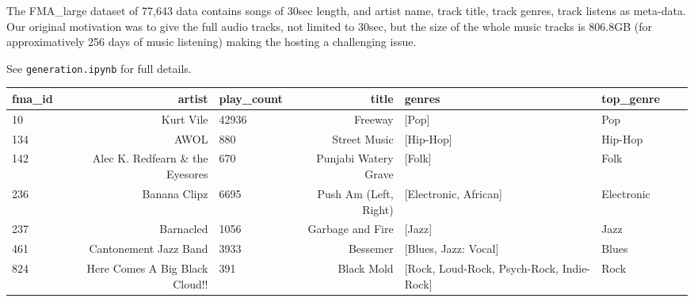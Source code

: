 \documentclass{article}
\begin{document}
The FMA\_large dataset of 77,643 data contains songs of 30sec length, and artist name, track title, track genres, track listens as meta-data. Our original motivation was to give the full audio tracks, not limited to 30sec, but the size of the whole music tracks is 806.8GB (for approximatively 256 days of music listening) making the hosting a challenging issue.

See \texttt{generation.ipynb} for full details.

\begin{table}
	\tiny
	\centering
	\begin{tabular}{lrlrllll}
	\toprule
	 fma\_id &                                             artist &  play\_count &                                              title &                                             genres &            top\_genre  \\
	 \toprule
		10 &                                          Kurt Vile &       42936 &                                            Freeway &                                              [Pop] &                  Pop  \\
		134 &                                               AWOL &         880 &                                       Street Music &                                          [Hip-Hop] &              Hip-Hop  \\
		 142 &                    Alec K. Redfearn \& the Eyesores &         670 &                               Punjabi Watery Grave &                                             [Folk] &                 Folk  \\
		 236 &                                       Banana Clipz &        6695 &                              Push Am (Left, Right) &                              [Electronic, African] &           Electronic  \\
		 237 &                                          Barnacled &        1056 &                    Garbage and Fire &                                             [Jazz] &                 Jazz  \\
		 461 &                              Cantonement Jazz Band &        3933 &                                           Bessemer &                               [Blues, Jazz: Vocal] &                Blues  \\
		824 &                     Here Comes A Big Black Cloud!! &         391 &                                         Black Mold &          [Rock, Loud-Rock, Psych-Rock, Indie-Rock] &                 Rock  \\

\end{tabular}
\end{table}
\end{document}
